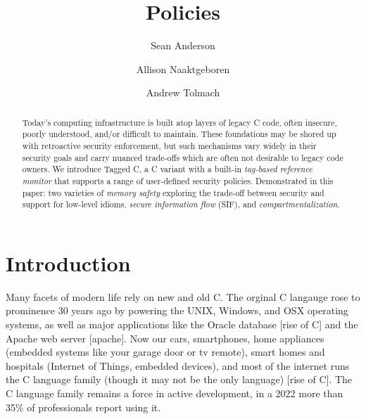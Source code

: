 \documentclass[acmsmall,review,anonymous]{acmart}\settopmatter{printfolios=true,printccs=false,printacmref=false}
\title{Policies}
\author{Sean Anderson}
\affiliation{
  \department{Computer Science}
  \institution{Portland State University}
}
\author{Allison Naaktgeboren}
\affiliation{
  \department{Computer Science}
  \institution{Portland State University}
}
\author{Andrew Tolmach}
\affiliation{
  \department{Computer Science}
  \institution{Portland State University}
}
\begin{document}




\begin{abstract}
Today's computing infrastructure is built atop layers of legacy C code, often
insecure, poorly understood, and/or difficult to maintain. These foundations may be shored up with retroactive security
enforcement, but such mechanisms vary widely in their security goals and carry nuanced trade-offs which are often 
not desirable to legacy code owners. We introduce Tagged C, a C variant with a built-in
{\em tag-based reference monitor} that supports a range of user-defined security policies.
Demonstrated in this paper: two varieties of {\em memory safety} exploring the trade-off between
security and support for low-level idioms, {\em secure information flow} (SIF),
and {\em compartmentalization}.
\end{abstract}

\maketitle

\section{Introduction}

%

Many facets of modern life rely on new and old C. The orginal C langauge rose to prominence 30 years ago by powering
the UNIX, Windows, and OSX operating systems,  as well as major applications like the Oracle database [rise of C] 
and the Apache web server [apache]. Now our cars, smartphones, 
home appliances (embedded systems like your garage door or tv remote), smart homes and hospitals (Internet of Things, embedded devices), 
and most of the internet runs the C language family (though it may not be the only language) [rise of C]. 
The C language family remains a force in active development, in a 2022 more 
than 35\% of professionals report using it.
\end{document}
